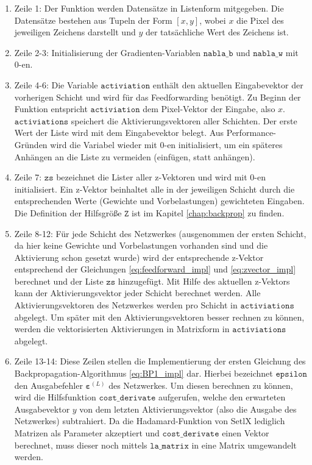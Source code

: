 \begin{enumerate}
\item Zeile 1: Der Funktion werden Datensätze in Listenform mitgegeben. Die Datensätze bestehen aus Tupeln der Form $[x,y]$, wobei $x$ die Pixel des jeweiligen Zeichens darstellt und $y$ der tatsächliche Wert des Zeichens ist.
\item Zeile 2-3: Initialisierung der Gradienten-Variablen $\mathtt{nabla\_b}$ und $\mathtt{nabla\_w}$ mit 0-en.
\item Zeile 4-6: Die Variable $\mathtt{activiation}$ enthält den aktuellen Eingabevektor der vorherigen Schicht und wird für das Feedforwarding benötigt. Zu Beginn der Funktion entspricht $\mathtt{activiation}$ dem Pixel-Vektor der Eingabe, also $x$. $\mathtt{activiations}$ speichert die Aktivierungsvektoren aller Schichten. Der erste Wert der Liste wird mit dem Eingabevektor belegt. Aus Performance-Gründen wird die Variabel wieder mit 0-en initialisiert, um ein späteres Anhängen an die Liste zu vermeiden (einfügen, statt anhängen).
\item Zeile 7: $\mathtt{zs}$ bezeichnet die Lister aller z-Vektoren und wird mit 0-en initialisiert. Ein z-Vektor beinhaltet alle in der jeweiligen Schicht durch die entsprechenden Werte (Gewichte und Vorbelastungen) gewichteten Eingaben. Die Definition der Hilfsgröße $\mathtt{Z}$ ist im Kapitel \ref{chap:backprop} zu finden.
\item Zeile 8-12: Für jede Schicht des Netzwerkes (ausgenommen der ersten Schicht, da hier keine Gewichte und Vorbelastungen vorhanden sind und die Aktivierung schon gesetzt wurde) wird der entsprechende z-Vektor entsprechend der Gleichungen \eqref{eq:feedforward_impl} und \eqref{eq:zvector_impl} berechnet und der Liste $\mathtt{zs}$ hinzugefügt. Mit Hilfe des aktuellen z-Vektors kann der Aktivierungsvektor jeder Schicht berechnet werden. Alle Aktivierungsvektoren des Netzwerkes werden pro Schicht in $\mathtt{activiations}$ abgelegt. Um später mit den Aktivierungsvektoren besser rechnen zu können, werden die vektorisierten Aktivierungen in Matrixform in $\mathtt{activiations}$ abgelegt.
\item Zeile 13-14: Diese Zeilen stellen die Implementierung der ersten Gleichung des Backpropagation-Algorithmus \eqref{eq:BP1_impl} dar. Hierbei bezeichnet $\mathtt{epsilon}$ den Ausgabefehler $\boldsymbol{\varepsilon}^{(L)}$ des Netzwerkes. Um diesen berechnen zu können, wird die Hilfsfunktion $\mathtt{cost\_derivate}$ aufgerufen, welche den erwarteten Ausgabevektor $y$ von dem letzten Aktivierungsvektor (also die Ausgabe des Netzwerkes) subtrahiert. Da die Hadamard-Funktion von SetlX lediglich Matrizen als Parameter akzeptiert und $\mathtt{cost\_derivate}$ einen Vektor berechnet, muss dieser noch mittels $\mathtt{la\_matrix}$ in eine Matrix umgewandelt werden.

\end{enumerate}
